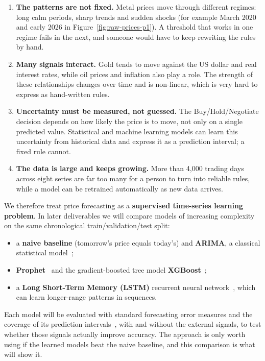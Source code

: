 \begin{enumerate}
  \item \textbf{The patterns are not fixed.} Metal prices move through
        different regimes: long calm periods, sharp trends and sudden shocks
        (for example March 2020 and early 2026 in Figure~\ref{fig:raw-prices-p1}).
        A threshold that works in one regime fails in the next, and someone
        would have to keep rewriting the rules by hand.
  \item \textbf{Many signals interact.} Gold tends to move against the US
        dollar and real interest rates, while oil prices and inflation also
        play a role. The strength of these relationships changes over time
        and is non-linear, which is very hard to express as hand-written rules.
  \item \textbf{Uncertainty must be measured, not guessed.} The
        Buy/Hold/Negotiate decision depends on how likely the price is to move,
        not only on a single predicted value. Statistical and machine learning
        models can learn this uncertainty from historical data and express it
        as a prediction interval; a fixed rule cannot.
  \item \textbf{The data is large and keeps growing.} More than 4,000 trading
        days across eight series are far too many for a person to turn into
        reliable rules, while a model can be retrained automatically as new
        data arrives.
\end{enumerate}

We therefore treat price forecasting as a \textbf{supervised time-series
learning problem}. In later deliverables we will compare models of increasing
complexity on the same chronological train/validation/test split:
\begin{itemize}
  \item a \textbf{naive baseline} (tomorrow's price equals today's) and
        \textbf{ARIMA}, a classical statistical model~\cite{a_box2015};
  \item \textbf{Prophet}~\cite{a_taylor2018} and the gradient-boosted tree
        model \textbf{XGBoost}~\cite{a_chen2016};
  \item a \textbf{Long Short-Term Memory (LSTM)} recurrent neural
        network~\cite{a_hochreiter1997}, which can learn longer-range patterns
        in sequences.
\end{itemize}
Each model will be evaluated with standard forecasting error measures and the
coverage of its prediction intervals~\cite{a_hyndman2021}, with and without the
external signals, to test whether those signals actually improve accuracy. The
approach is only worth using if the learned models beat the naive baseline,
and this comparison is what will show it.